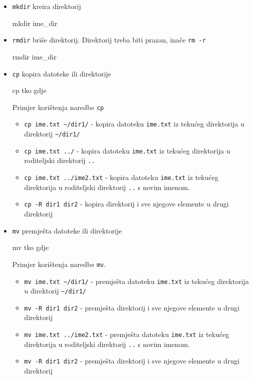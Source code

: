 \begin{itemize}
\item \texttt{mkdir} kreira direktorij
\begin{prototip}
mkdir ime_dir 
\end{prototip}

\item \texttt{rmdir} briše direktorij. Direktorij treba biti prazan, inače \texttt{rm -r}
\begin{prototip}
rmdir ime_dir 
\end{prototip}


\item \texttt{cp} kopira datoteke ili direktorije
\begin{prototip}
cp tko gdje 
\end{prototip}

\begin{primjer} Primjer korištenja naredbe \texttt{cp}
\begin{itemize}
 \item \lstinline!cp ime.txt ~/dir1/! - kopira datoteku \texttt{ime.txt} iz tekućeg direktorija u direktorij \lstinline!~/dir1/!
\item \lstinline!cp ime.txt ../! - kopira datoteku \texttt{ime.txt} iz tekućeg direktorija u roditeljski direktorij \texttt{..}
\item \lstinline!cp ime.txt ../ime2.txt! - kopira datoteku \texttt{ime.txt} iz tekućeg direktorija u roditeljski direktorij \texttt{..} s novim imenom.
 \item \lstinline!cp -R dir1 dir2! - kopira direktorij i sve njegove elemente u drugi direktorij 
\end{itemize}
\end{primjer}

\item \texttt{mv} premješta datoteke ili direktorije
\begin{prototip}
mv tko gdje
\end{prototip}

\begin{primjer} Primjer korištenja naredbe \texttt{mv}.
\begin{itemize}
 \item \lstinline!mv ime.txt ~/dir1/! - premješta datoteku \texttt{ime.txt} iz tekućeg direktorija u direktorij \lstinline!~/dir1/!
 \item \lstinline!mv -R dir1 dir2! - premješta direktorij i sve njegove elemente u drugi direktorij 
\item \lstinline!mv ime.txt ../ime2.txt! - premješta datoteku \texttt{ime.txt} iz tekućeg direktorija u roditeljski direktorij \texttt{..} s novim imenom.
 \item \lstinline!mv -R dir1 dir2! - premješta direktorij i sve njegove elemente u drugi direktorij 
\end{itemize}
\end{primjer}

\end{itemize}
